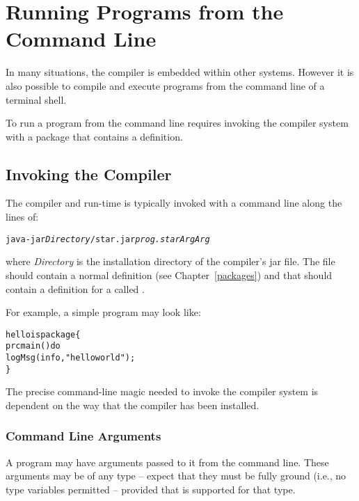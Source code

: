\chapter{Running Programs from the Command Line}
\label{commandLineRunning}

In many situations, the \Sr compiler is embedded within other systems. However it is also possible to compile and execute \Sr programs from the command line of a terminal shell.

\label{commandLine}
To run a program from the command line requires invoking the \Sr compiler system with a package that contains a  definition.

\section{Invoking the \Sr Compiler}
The \Sr compiler and run-time is typically invoked with a command line along the lines of:
\begin{alltt}
java -jar \emph{Directory}/star.jar \emph{prog.star} \emph{Arg}\sequence{\quad}\emph{Arg\subn}
\end{alltt}
where \emph{Directory} is the installation directory of the \Sr compiler's jar file. The  file  should contain a normal  definition (see Chapter~\vref{packages}) and that  should contain a definition for a  called .

For example, a simple  program may look like:
\begin{alltt}
hello is package\{
  prc main() do 
    logMsg(info,"hello world");
\}
\end{alltt}

\begin{aside}
The precise command-line magic needed to invoke the \Sr compiler system is dependent on the way that the \Sr compiler has been installed.
\end{aside}

\subsection{Command Line Arguments}
\label{commandLineArgs}

A \Sr {} program may have arguments passed to it from the command line. These arguments may be of any type -- expect that they must be fully ground (i.e., no type variables permitted -- provided that  is supported for that type.


